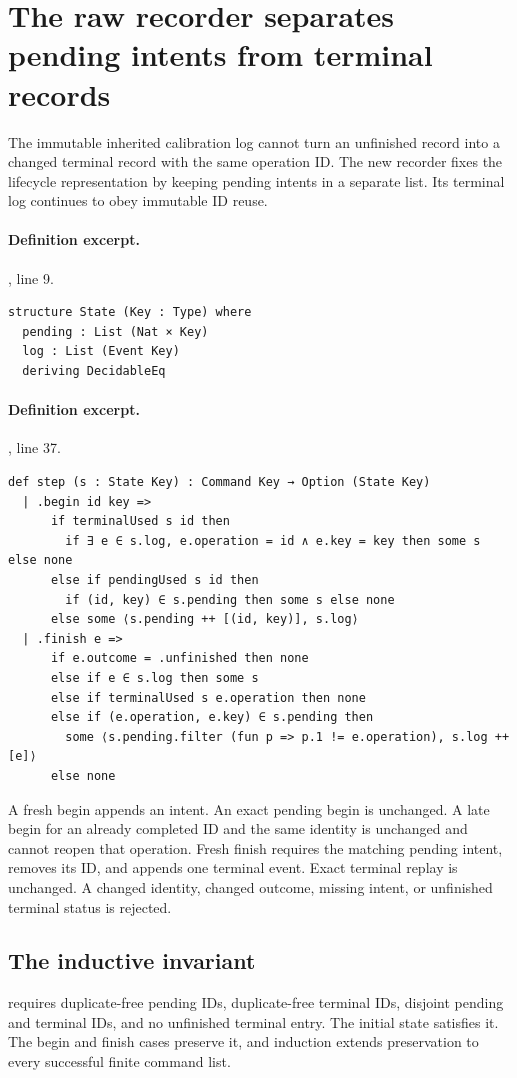 \documentclass[11pt]{article}
\begin{document}
\section{The raw recorder separates pending intents from terminal records}
\label{sec:raw}
The immutable inherited calibration log cannot turn an unfinished record into
a changed terminal record with the same operation ID. The new recorder fixes
the lifecycle representation by keeping pending intents in a separate list.
Its terminal log continues to obey immutable ID reuse.

\paragraph{Definition excerpt.}, line 9.
\begin{lstlisting}[style=AVOCSource]
structure State (Key : Type) where
  pending : List (Nat × Key)
  log : List (Event Key)
  deriving DecidableEq
\end{lstlisting}

\paragraph{Definition excerpt.}, line 37.
\begin{lstlisting}[style=AVOCSource]
def step (s : State Key) : Command Key → Option (State Key)
  | .begin id key =>
      if terminalUsed s id then
        if ∃ e ∈ s.log, e.operation = id ∧ e.key = key then some s else none
      else if pendingUsed s id then
        if (id, key) ∈ s.pending then some s else none
      else some ⟨s.pending ++ [(id, key)], s.log⟩
  | .finish e =>
      if e.outcome = .unfinished then none
      else if e ∈ s.log then some s
      else if terminalUsed s e.operation then none
      else if (e.operation, e.key) ∈ s.pending then
        some ⟨s.pending.filter (fun p => p.1 != e.operation), s.log ++ [e]⟩
      else none
\end{lstlisting}


A fresh begin appends an intent. An exact pending begin is unchanged. A late
begin for an already completed ID and the same identity is unchanged and
cannot reopen that operation. Fresh finish requires the matching pending
intent, removes its ID, and appends one terminal event. Exact terminal replay
is unchanged. A changed identity, changed outcome, missing intent, or
unfinished terminal status is rejected.

\subsection{The inductive invariant}
 requires duplicate-free pending IDs, duplicate-free terminal
IDs, disjoint pending and terminal IDs, and no unfinished terminal entry. The
initial state satisfies it. The begin and finish cases preserve it, and
induction extends preservation to every successful finite command list.
\end{document}
